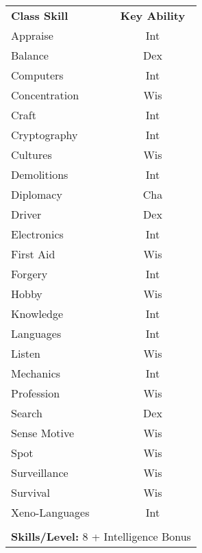 \begin{table}[htb]
\raggedright
\begin{tabular}{l c}
\textbf{Class Skill} & \textbf{Key Ability}\\

Appraise & Int\\
Balance & Dex\\
Computers & Int\\
Concentration & Wis\\
Craft & Int\\
Cryptography & Int\\
Cultures & Wis\\
Demolitions & Int\\
Diplomacy & Cha\\
Driver & Dex\\
Electronics & Int\\
First Aid & Wis\\
Forgery & Int\\
Hobby & Wis\\
Knowledge & Int\\
Languages & Int\\
Listen & Wis\\
Mechanics & Int\\
Profession & Wis\\
Search & Dex\\
Sense Motive & Wis\\
Spot & Wis\\
Surveillance & Wis\\
Survival & Wis\\
Xeno-Languages & Int\\

\multicolumn{2}{l}{\cellcolor{white}}\\
\multicolumn{2}{l}{\cellcolor{white}\textbf{Skills/Level:} 8 + Intelligence Bonus}\\
\end{tabular}
\end{table}

\pagebreak

\poorbab{}
\poorfor{}
\poorref{}
\goodwil{}
\gooddefb{}
\poorinit{}
\goodgear{}
\goodres{}

